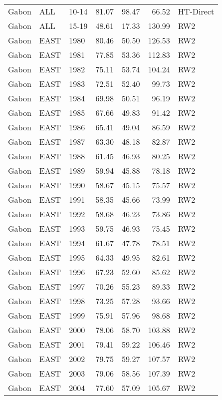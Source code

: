 \begin{longtable}{lllrrrl}
  Gabon & ALL & 10-14 & 81.07 & 98.47 & 66.52 & HT-Direct \\ 
  Gabon & ALL & 15-19 & 48.61 & 17.33 & 130.99 & RW2 \\ 
  Gabon & EAST & 1980 & 80.46 & 50.50 & 126.53 & RW2 \\ 
  Gabon & EAST & 1981 & 77.85 & 53.36 & 112.83 & RW2 \\ 
  Gabon & EAST & 1982 & 75.11 & 53.74 & 104.24 & RW2 \\ 
  Gabon & EAST & 1983 & 72.51 & 52.40 & 99.73 & RW2 \\ 
  Gabon & EAST & 1984 & 69.98 & 50.51 & 96.19 & RW2 \\ 
  Gabon & EAST & 1985 & 67.66 & 49.83 & 91.42 & RW2 \\ 
  Gabon & EAST & 1986 & 65.41 & 49.04 & 86.59 & RW2 \\ 
  Gabon & EAST & 1987 & 63.30 & 48.18 & 82.87 & RW2 \\ 
  Gabon & EAST & 1988 & 61.45 & 46.93 & 80.25 & RW2 \\ 
  Gabon & EAST & 1989 & 59.94 & 45.88 & 78.18 & RW2 \\ 
  Gabon & EAST & 1990 & 58.67 & 45.15 & 75.57 & RW2 \\ 
  Gabon & EAST & 1991 & 58.35 & 45.66 & 73.99 & RW2 \\ 
  Gabon & EAST & 1992 & 58.68 & 46.23 & 73.86 & RW2 \\ 
  Gabon & EAST & 1993 & 59.75 & 46.93 & 75.45 & RW2 \\ 
  Gabon & EAST & 1994 & 61.67 & 47.78 & 78.51 & RW2 \\ 
  Gabon & EAST & 1995 & 64.33 & 49.95 & 82.61 & RW2 \\ 
  Gabon & EAST & 1996 & 67.23 & 52.60 & 85.62 & RW2 \\ 
  Gabon & EAST & 1997 & 70.26 & 55.23 & 89.33 & RW2 \\ 
  Gabon & EAST & 1998 & 73.25 & 57.28 & 93.66 & RW2 \\ 
  Gabon & EAST & 1999 & 75.91 & 57.96 & 98.68 & RW2 \\ 
  Gabon & EAST & 2000 & 78.06 & 58.70 & 103.88 & RW2 \\ 
  Gabon & EAST & 2001 & 79.41 & 59.22 & 106.46 & RW2 \\ 
  Gabon & EAST & 2002 & 79.75 & 59.27 & 107.57 & RW2 \\ 
  Gabon & EAST & 2003 & 79.06 & 58.56 & 107.39 & RW2 \\ 
  Gabon & EAST & 2004 & 77.60 & 57.09 & 105.67 & RW2 \\ 

\end{longtable}
